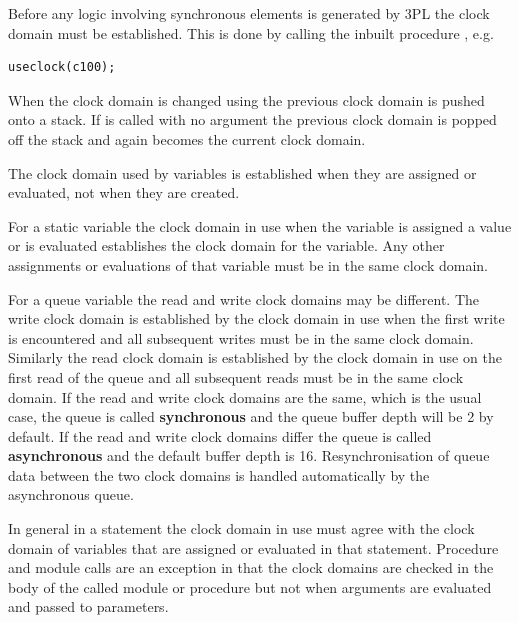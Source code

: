         Before any logic involving synchronous elements is generated by 3PL the
        clock domain must be established. This is done by calling the inbuilt
        procedure , e.g.
        \begin{lstlisting}[language=threepl]
            useclock(c100);
        \end{lstlisting}

        When the clock domain is changed using  the previous clock domain
        is pushed onto a stack. If  is called with no argument the previous
        clock domain is popped off the stack and again becomes the current clock domain.

        The clock domain used by variables is established when they are assigned
        or evaluated, not when they are created.

        For a static variable the clock domain in use when the variable is assigned
        a value or is evaluated establishes the clock domain for the variable. Any
        other assignments or evaluations of that variable must be in the same clock
        domain.

        For a queue variable the read and write clock domains may be different. The write
        clock domain is established by the clock domain in use when the first write is
        encountered and all subsequent writes must be in the same clock domain. Similarly
        the read clock domain is established by the clock domain in use on the first read
        of the queue and all subsequent reads must be in the same clock domain. If the read
        and write clock domains are the same, which is the usual case, the queue is called
        {\bf synchronous} and the queue buffer depth will be 2 by default. If the read and
        write clock domains differ the queue is called {\bf asynchronous} and the default
        buffer depth is 16. Resynchronisation of queue data between the two clock domains
        is handled automatically by the asynchronous queue.

        In general in a statement the clock domain in use must agree with the clock
        domain of variables that are assigned or evaluated in that statement.
        Procedure and module calls are an exception in that the clock domains are
        checked in the body of the called module or procedure but not when arguments
        are evaluated and passed to parameters.

